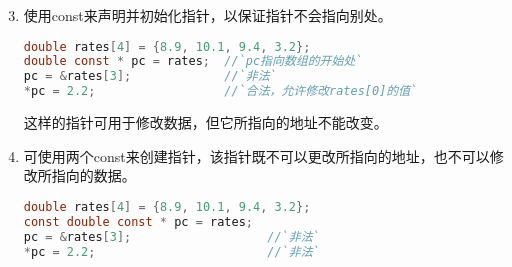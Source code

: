 \begin{frame}[fragile]
\begin{enumerate}\setcounter{enumi}{2}
\item 使用{\tf const}来声明并初始化指针，以保证指针不会指向别处。
\begin{lstlisting}[language=c,backgroundcolor=\color{red!20}]
double rates[4] = {8.9, 10.1, 9.4, 3.2};
double const * pc = rates;  //`pc指向数组的开始处`
pc = &rates[3];             //`非法`
*pc = 2.2;                  //`合法，允许修改rates[0]的值`
\end{lstlisting}
这样的指针可用于修改数据，但它所指向的地址不能改变。
\end{enumerate}
\end{frame}


\begin{frame}[fragile]
\begin{enumerate}\setcounter{enumi}{3}
\item 可使用两个{\tf const}来创建指针，该指针既不可以更改所指向的地址，也不可以修改所指向的数据。
\begin{lstlisting}[language=c,backgroundcolor=\color{red!20}]
double rates[4] = {8.9, 10.1, 9.4, 3.2};
const double const * pc = rates;   
pc = &rates[3];                   //`非法`
*pc = 2.2;                        //`非法`
\end{lstlisting}
\end{enumerate}
\end{frame}
